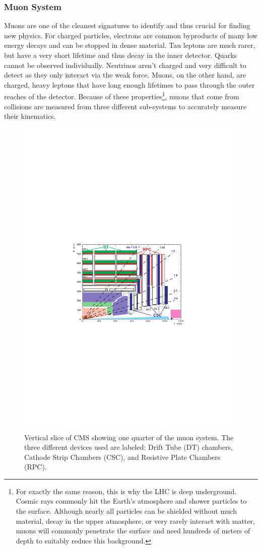\subsubsection{Muon System}
\label{sec:MuonSystem}

Muons are one of the cleanest signatures to identify and thus crucial for finding new physics. For charged particles, electrons are common byproducts of many low energy decays and can be stopped in dense material. Tau leptons are much rarer, but have a very short lifetime and thus decay in the inner detector. Quarks cannot be observed individually. Neutrinos aren't charged and very difficult to detect as they only interact via the weak force. Muons, on the other hand, are charged, heavy leptons that have long enough lifetimes to pass through the outer reaches of the detector. Because of these properties\footnote{For exactly the same reason, this is why the LHC is deep underground. Cosmic rays commonly hit the Earth's atmosphere and shower particles to the surface. Although nearly all particles can be shielded without much material, decay in the upper atmosphere, or very rarely interact with matter, muons will commonly penetrate the surface and need hundreds of meters of depth to suitably reduce this background.}, muons that come from collisions are measured from three different sub-systems to accurately measure their kinematics. 

\begin{figure}[htbp]
\begin{center}
\includegraphics[width=.7\linewidth]{Experiment/figures/MuonSystem.pdf}
\caption[Arrangement of Detectors in CMS Muon System]{Vertical slice of CMS showing one quarter of the muon system. The three different devices used are labeled: Drift Tube (DT) chambers, Cathode Strip Chambers (CSC), and Resistive Plate Chambers (RPC).}
\label{fig:MuonSystem}
\end{center}
\end{figure}

